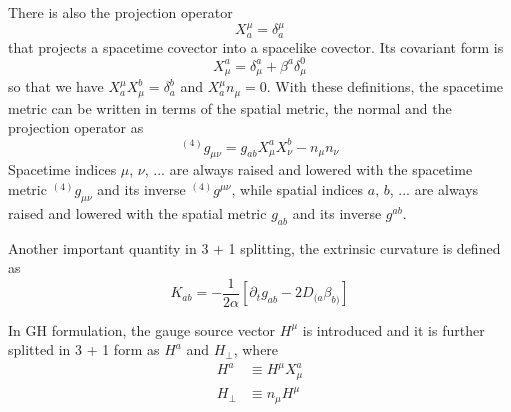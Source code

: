\documentclass[letterpaper,nofootinbib,prd,amsmath,onecolumn]{revtex4-1}
\begin{document}
There is also the projection operator
\begin{equation}\label{projection 1}
X^{\mu}_{a} = \delta^{\mu}_{a}
\end{equation}
that projects a spacetime covector into a spacelike covector. Its covariant form is
\begin{equation}\label{projection 2}
X^{a}_{\mu} = \delta^{a}_{\mu} + \beta^{a}\delta^{0}_{\mu}
\end{equation}
so that we have $X^{\mu}_{a}X^{b}_{\mu} = \delta^{b}_{a}$ and $X^{\mu}_{a}n_{\mu} = 0$. 
With these definitions, the spacetime metric can be written in terms of the spatial metric, the normal and the projection operator as
\begin{equation}\label{spacetime metric 3 + 1}
^{\left(4\right)}g_{\mu\nu} = g_{ab}X^{a}_{\mu}X^{b}_{\nu} - n_{\mu}n_{\nu}
\end{equation}
Spacetime indices $\mu$, $\nu$, ... are always raised and lowered with the spacetime metric $^{\left(4\right)}g_{\mu\nu}$ and its inverse $^{\left(4\right)}g^{\mu\nu}$, while spatial indices $a$, $b$, ... are always raised and lowered with the spatial metric $g_{ab}$ and its inverse $g^{ab}$. 

Another important quantity in 3 + 1 splitting, the extrinsic curvature is defined as
\begin{equation}\label{extrinsic}
K_{ab} = - \frac{1}{2\alpha}\left[\partial_{t}g_{ab} - 2D_{(a}\beta_{b)}\right]
\end{equation}

In GH formulation, the gauge source vector $H^{\mu}$ is introduced and it is further splitted in 3 + 1 form as $H^{a}$ and $H_{\perp}$, where
\begin{align}
H^{a} & \equiv H^{\mu}X^{a}_{\mu}\\
H_{\perp} & \equiv n_{\mu}H^{\mu}
\end{align}

\end{document}
